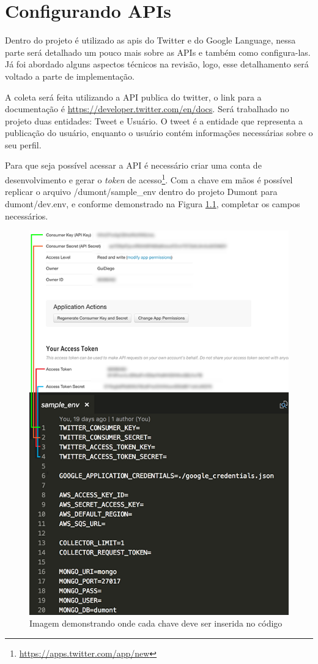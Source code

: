 \chapter{Configurando APIs}
\label{app:configuracoes}
Dentro do projeto é utilizado as apis do Twitter e do Google Language, nessa parte será detalhado um pouco mais sobre as APIs e também como configura-las. Já foi abordado alguns aspectos técnicos na revisão, logo, esse detalhamento será voltado a parte de implementação.

A coleta será feita utilizando a API publica do twitter, o link para a documentação é \url{https://developer.twitter.com/en/docs}. Será trabalhado no projeto duas entidades: Tweet e Usuário. O tweet é a entidade que representa a publicação do usuário, enquanto o usuário contém informações necessárias sobre o seu perfil.

Para que seja possível acessar a API é necessário criar uma conta de desenvolvimento e gerar o \textit{token} de acesso\footnote{\url{https://apps.twitter.com/app/new}}. Com a chave em mãos é possível replicar o arquivo /dumont/sample\_env dentro do projeto Dumont para dumont/dev.env, e conforme demonstrado na Figura \ref{fig:twitteropts}, completar os campos necessários.

\begin{figure}
    \centering
    \includegraphics[width=.8\textwidth]{imagens/twitteropts.png}
    \caption{Imagem demonstrando onde cada chave deve ser inserida no código}
    \label{fig:twitteropts}
\end{figure}

